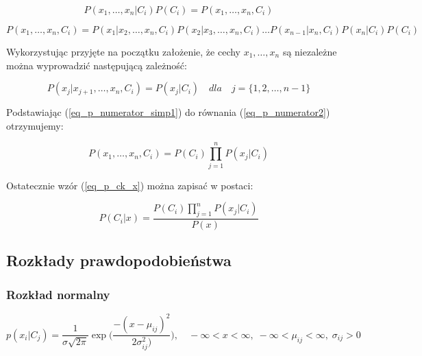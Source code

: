 	\begin{equation}
	\label{eq_p_numerator1}
		P(x_1, \dots , x_n | C_i)P(C_i) = P(x_1, \dots, x_n, C_i)
	\end{equation}

	\begin{equation}
	\label{eq_p_numerator2}
		P(x_1, \dots, x_n, C_i) = P(x_1 | x_2 , \dots , x_n, C_i)P(x_2 | x_3, \dots , x_n, 	C_i) \dots P(x_{n-1} | x_n, C_i)P(x_n | C_i)P(C_i)
	\end{equation}
	
Wykorzystując przyjęte na początku założenie, że cechy ${x_1, \dots, x_n}$ są niezależne można wyprowadzić następującą zależność:

	\begin{equation}
	\label{eq_p_numerator_simp1}
		P(x_j | x_{j+1}, \dots , x_n, C_i) = P(x_j | C_i) \quad dla \quad j = \{1, 2, \dots, n-1\}
	\end{equation}

Podstawiając (\ref{eq_p_numerator_simp1}) do równania (\ref{eq_p_numerator2}) otrzymujemy:
	
	\begin{equation}
	\label{eq_p_numerator_simp2}
		P(x_1, \dots, x_n, C_i) = P(C_i) \prod_{j = 1}^n P(x_j | C_i)
	\end{equation}

Ostatecznie wzór (\ref{eq_p_ck_x}) można zapisać w postaci:

	\begin{equation}
	\label{eq_p_ck_x_simp}
		P(C_i | x) = \frac{P(C_i) \prod_{j = 1}^n P(x_j | C_i)}{P(x)}
	\end{equation}


\subsection{Rozkłady prawdopodobieństwa}
\label{sec_rozklady}

\subsubsection{Rozkład normalny}
\label{subsec_gauss}

	\begin{equation}
	\label{eq_gauss}
	p(x_i | C_j) = \frac{1}{\sigma \sqrt{2 \pi}}\exp\bigg(\frac{-(x-\mu_{ij})^2}{2\sigma_{ij}^2)}\bigg), \quad
	-\infty < x < \infty, \; -\infty < \mu_{ij} < \infty, \; \sigma_{ij}  > 0
	\end{equation}


